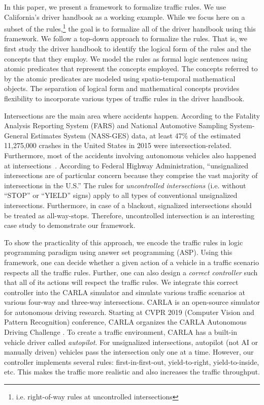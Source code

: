 In this paper,
we present a framework to formalize traffic rules.
We use California's driver handbook as a working example.
While we focus here on a subset of the rules,\footnote{i.e. right-of-way rules at uncontrolled intersections}
the goal is to formalize all of the driver handbook using this framework.
We follow a top-down approach to formalize the rules.
That is,
we first study the driver handbook to identify
the logical form of the rules and the concepts that they employ.
We model the rules as formal logic sentences
using atomic predicates that represent the concepts employed.
The concepts referred to by the atomic predicates
are modeled using spatio-temporal mathematical objects.
The separation of logical form and mathematical concepts
provides flexibility to incorporate various types of traffic rules in the driver handbook.

Intersections are the main area where accidents happen.
According to the Fatality Analysis Reporting System (FARS) and National Automotive Sampling System-General Estimates System (NASS-GES) data, at least 47\% of the estimated 11,275,000 crashes in the United States in 2015 \cite{DOT.2017} were intersection-related.
Furthermore,
most of the accidents involving autonomous vehicles also happened at intersections~\cite{CADMVdocumentation,nhtsareport}.
According to Federal Highway Administration, ``unsignalized intersections are of particular concern because they comprise the vast majority of intersections in the U.S.''\cite{FHWA-Unsignalized.2019}
The rules for \emph{uncontrolled intersections} (i.e. without ``STOP'' or ``YIELD'' signs)
apply to all types of conventional unsignalized intersections.
Furthermore,
in case of a blackout,
signalized intersections should be treated as all-way-stops.\cite{DMV-California.2019}
Therefore,
uncontrolled intersection is an interesting case study to demonstrate our framework.

To show the practicality of this approach, we encode the traffic rules in logic programming paradigm using answer set programming (ASP). 
Using this framework, one can decide whether a given action of a vehicle in a traffic scenario respects all the traffic rules.
Further, one can also design a \emph{correct controller} such that all of its actions will respect the traffic rules. 
We integrate this correct controller into the CARLA simulator and simulate various traffic scenarios at various four-way and three-way intersections.
CARLA\cite{Dosovitskiy.2017} is an open-source simulator for autonomous driving research.
Starting at CVPR 2019 (Computer Vision and Pattern Recognition) conference, CARLA organizes the CARLA Autonomous Driving Challenge \cite{CARLA-Challenge.2019}.
To create a traffic environment, CARLA has a built-in vehicle driver called \emph{autopilot}.
For unsignalized intersections,
autopilot (not AI or manually driven) vehicles
pass the intersection only one at a time.
However, our controller implements several rules:
first-in-first-out,
yield-to-right,
yield-to-inside, etc.
This makes the traffic more realistic and also increases the traffic throughput.


